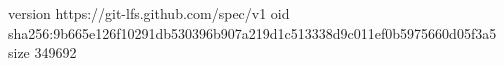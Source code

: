 version https://git-lfs.github.com/spec/v1
oid sha256:9b665e126f10291db530396b907a219d1c513338d9c011ef0b5975660d05f3a5
size 349692
